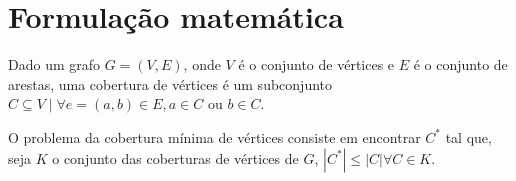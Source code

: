 \section{Formulação matemática}
\label{sec:formulacao}

Dado um grafo $G = (V, E)$, onde $V$ é o conjunto de vértices e $E$ é
o conjunto de arestas, uma cobertura de vértices é um subconjunto $C
\subseteq V \mid \forall e=(a,b) \in E, a \in C \mbox{ ou } b \in C$.

O problema da cobertura mínima de vértices consiste em encontrar $C^*$
tal que, seja $K$ o conjunto das coberturas de vértices de $G$,
    $\left| C^* \right|
\leq \left| C \right| \forall C \in K$.
